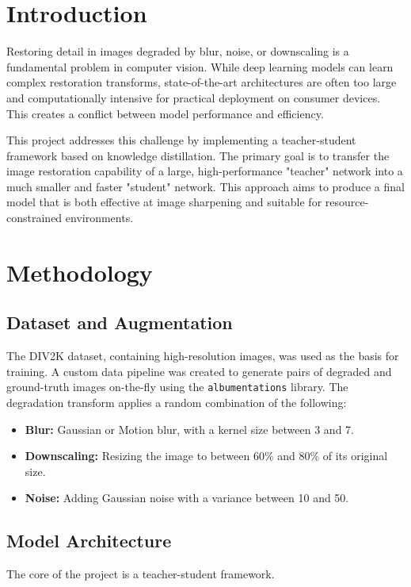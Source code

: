\documentclass[12pt,a4paper]{article}
\begin{document}
\section{Introduction}
Restoring detail in images degraded by blur, noise, or downscaling is a fundamental problem in computer vision. While deep learning models can learn complex restoration transforms, state-of-the-art architectures are often too large and computationally intensive for practical deployment on consumer devices. This creates a conflict between model performance and efficiency.

This project addresses this challenge by implementing a teacher-student framework based on knowledge distillation. The primary goal is to transfer the image restoration capability of a large, high-performance "teacher" network into a much smaller and faster "student" network. This approach aims to produce a final model that is both effective at image sharpening and suitable for resource-constrained environments.

\newpage
\section{Methodology}

\subsection{Dataset and Augmentation}
The DIV2K dataset, containing high-resolution images, was used as the basis for training. A custom data pipeline was created to generate pairs of degraded and ground-truth images on-the-fly using the \texttt{albumentations} library. The degradation transform applies a random combination of the following:
\begin{itemize}
    \item \textbf{Blur:} Gaussian or Motion blur, with a kernel size between 3 and 7.
    \item \textbf{Downscaling:} Resizing the image to between 60\% and 80\% of its original size.
    \item \textbf{Noise:} Adding Gaussian noise with a variance between 10 and 50.
\end{itemize}

\subsection{Model Architecture}
The core of the project is a teacher-student framework.
\end{document}
